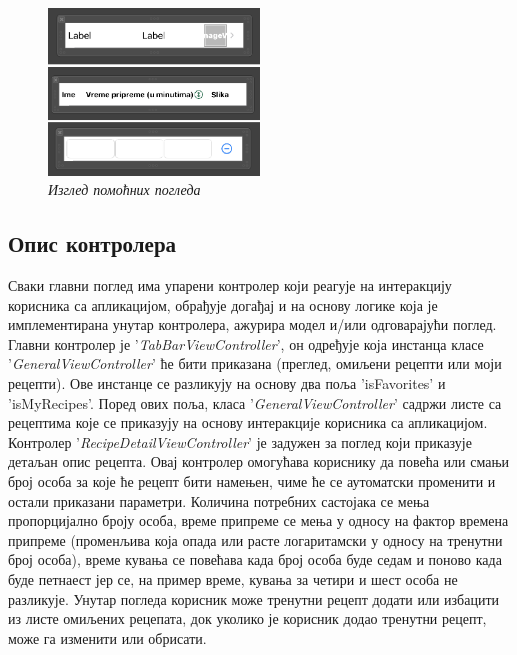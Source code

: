 \documentclass[12pt,oneside]{memoir}
\begin{document}
\begin{figure} [H]
    \centering
    \captionsetup{justification=centering}
    \includegraphics[width=0.5\textwidth]{images/helper_views.png} 
    \caption{\textit{Изглед помоћних погледа}}
    \label{slika:помоћни_погледи}
\end{figure}

\subsection{Опис контролера}

Сваки главни поглед има упарени контролер који реагује на интеракцију корисника са апликацијом, обрађује догађај и на основу логике која је имплементирана унутар контролера, ажурира модел и/или одговарајући поглед. Главни контролер је '\textit{TabBarViewController}', он одређује која инстанца класе '\textit{GeneralViewController}' ће бити приказана (преглед, омиљени рецепти или моји рецепти). Ове инстанце се разликују на основу два поља 'isFavorites' и 'isMyRecipes'. Поред ових поља, класа '\textit{GeneralViewController}' садржи листе са рецептима које се приказују на основу интеракције корисника са апликацијом. 
Контролер '\textit{RecipeDetailViewController}' је задужен за поглед који приказује детаљан опис рецепта. Овај контролер омогућава кориснику да повећа или смањи број особа за које ће рецепт бити намењен, чиме ће се аутоматски променити и остали приказани параметри. Количина потребних састојака се мења пропорцијално броју особа, време припреме се мења у односу на фактор времена припреме (променљива која опада или расте логаритамски у односу на тренутни број особа), време кувања се повећава када број особа буде седам и поново када буде петнаест јер се, на пример време, кувања за четири и шест особа не разликује. Унутар погледа корисник може тренутни рецепт додати или избацити из листе омиљених рецепата, док уколико је корисник додао тренутни рецепт, може га изменити или обрисати.
\end{document}

